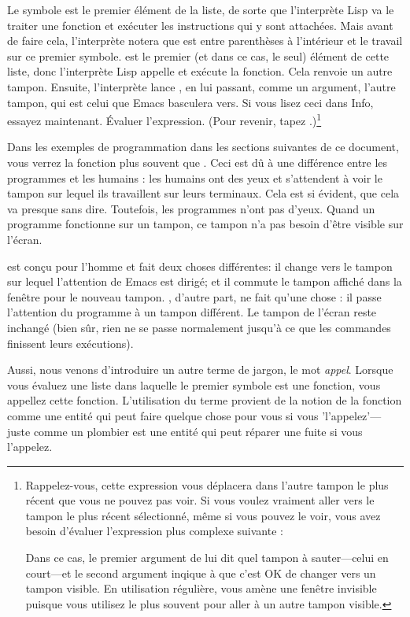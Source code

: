 Le symbole  est le premier élément de la liste,
de sorte que l'interprète Lisp va le traiter une fonction et exécuter
les instructions qui y sont attachées. Mais avant de faire cela,
l'interprète notera que  est entre parenthèses à
l'intérieur et le travail sur ce premier symbole. 
est le premier (et dans ce cas, le seul) élément de cette liste, donc
l'interprète Lisp appelle et exécute la fonction. Cela renvoie un
autre tampon. Ensuite, l'interprète lance , en
lui passant, comme un argument, l'autre tampon, qui est celui que
Emacs basculera vers. Si vous lisez ceci dans Info, essayez
maintenant. \'Evaluer l'expression. (Pour revenir, tapez .)\footnote{Rappelez-vous, cette expression vous déplacera dans
l'autre tampon le plus récent que vous ne pouvez pas voir. Si vous
voulez vraiment aller vers le tampon le plus récent sélectionné, même
si vous pouvez le voir, vous avez besoin d'évaluer l'expression plus
complexe suivante :


Dans ce cas, le premier argument de  lui dit quel
tampon à sauter---celui en court---et le second argument inqique à
 que c'est OK de changer vers un tampon visible. En
utilisation régulière,  vous amène une fenêtre
invisible puisque vous utilisez le plus souvent  pour aller à un autre tampon visible.}

Dans les exemples de programmation dans les sections suivantes de ce
document, vous verrez la fonction  plus souvent que
. Ceci est dû à une différence entre les
programmes et les humains : les humains ont des yeux et s'attendent à
voir le tampon sur lequel ils travaillent sur leurs terminaux. Cela
est si évident, que cela va presque sans dire. Toutefois, les
programmes n'ont pas d'yeux. Quand un programme fonctionne sur un
tampon, ce tampon n'a pas besoin d'être visible sur l'écran.

 est conçu pour l'homme et fait deux choses
différentes: il change vers le tampon sur lequel l'attention de Emacs
est dirigé; et il commute le tampon affiché dans la fenêtre pour le
nouveau tampon. , d'autre part, ne fait qu'une chose :
il passe l'attention du programme à un tampon différent. Le tampon de
l'écran reste inchangé (bien sûr, rien ne se passe normalement jusqu'à
ce que les commandes finissent leurs exécutions).

Aussi, nous venons d'introduire un autre terme de jargon, le mot
\textit{appel}. Lorsque vous évaluez une liste dans laquelle le
premier symbole est une fonction, vous appellez cette
fonction. L'utilisation du terme provient de la notion de la fonction
comme une entité qui peut faire quelque chose pour vous si vous
'l'appelez'---juste comme un plombier est une entité qui peut réparer
une fuite si vous l'appelez.